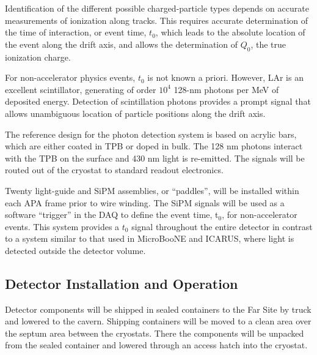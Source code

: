 Identification of the different possible charged-particle types 
depends on accurate measurements of ionization along tracks. This requires accurate determination
of the time of interaction, or event time, $t_0$, which leads to the absolute location 
of the event along the drift axis, and allows the determination of $Q_0$,  the 
true ionization charge.

For non-accelerator physics events, $t_0$ is not known a priori.  
However, LAr is an excellent scintillator, generating of 
order $10^{4}$ 128-nm photons per MeV of deposited energy.  
Detection of scintillation photons 
provides a prompt signal that allows unambiguous 
location of particle positions along the drift axis.

The reference design for the photon detection system is based on acrylic bars, which are either coated in TPB or doped in bulk. The 128 nm photons interact with the TPB on the surface and 430 nm light is re-emitted. 
The signals will be routed out of the cryostat to standard readout electronics.

Twenty light-guide and SiPM assemblies, or ``paddles'', will be installed within each APA frame prior to wire winding. The SiPM signals will be used as a software ``trigger'' in the DAQ to define the event time, t$_0$, for non-accelerator events. This system provides a $t_0$ signal throughout the entire detector in contrast to a system similar to that used in MicroBooNE and ICARUS, where light is detected outside the detector volume. 


\subsection{Detector Installation and Operation}
\label{sec:det-install}

Detector components will be shipped in sealed containers to the Far Site by truck and lowered to the cavern. Shipping containers will be moved to a clean area over the septum area between the cryostats. There the components will be unpacked from the sealed container and lowered  through an access hatch into the cryostat. 

